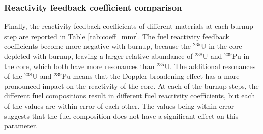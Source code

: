 \subsubsection{Reactivity feedback coefficient comparison}
Finally, the reactivity feedback coefficients of different materials 
at each burnup step are reported in Table \ref{tab:coeff_mmr}. The 
fuel reactivity feedback coefficients become more negative with 
burnup, because the $^{235}$U in the core depleted with burnup, 
leaving a larger relative abundance of $^{238}$U and $^{239}$Pu in 
the core, which both have more resonances than $^{235}$U. The 
additional resonances of the $^{238}$U and $^{239}$Pu means that the 
Doppler broadening effect has a more pronounced impact on the reactivity 
of the core. At each of the burnup steps, the different fuel compositions 
result in different fuel reactivity coefficients, but each of the values 
are within error of each other. The values being within error suggests 
that the fuel composition does not have a significant effect on 
this parameter. 

